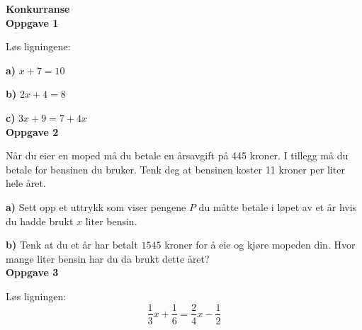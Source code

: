 \documentclass[12pt,english]{report}
\begin{document}
{\huge\textbf{Konkurranse}}\vspace{30 pt}\\
{\large \textbf{Oppgave 1}}

Løs ligningene:

\textbf{a)} $ x+7 = 10 $

\textbf{b)} $ 2x+4=8 $

\textbf{c)} $ 3x+9=7+4x $ \\

{\large \textbf{Oppgave 2}}

Når du eier en moped må du betale en årsavgift på 445 kroner. I tillegg må du betale for bensinen du bruker. Tenk deg at bensinen koster 11 kroner per liter hele året.

\textbf{a)} Sett opp et uttrykk som viser pengene $ P $ du måtte betale i løpet av et år hvis du hadde brukt $ x $ liter bensin.

\textbf{b)} Tenk at du et år har betalt $ 1545 $ kroner for å eie og kjøre mopeden din. Hvor mange liter bensin har du da brukt dette året?\\

{\large \textbf{Oppgave 3}}

Løs ligningen:
\[ \frac{1}{3}x+\frac{1}{6}=\frac{2}{4}x-\frac{1}{2} \]
\end{document}
